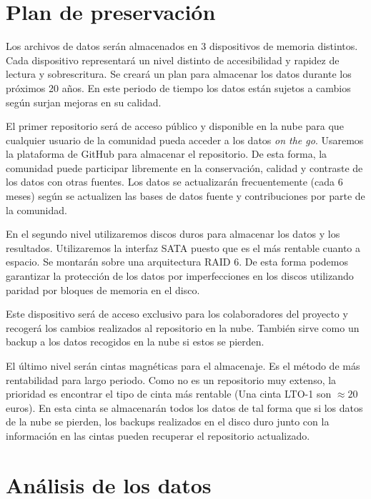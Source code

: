 \documentclass[12pt, spanish]{article}
\begin{document}
\section{Plan de preservación}
Los archivos de datos serán almacenados en 3 dispositivos de memoria distintos. Cada dispositivo representará un nivel distinto de accesibilidad y rapidez de lectura y sobrescritura. Se creará un plan para almacenar los datos durante los próximos 20 años. En este periodo de tiempo los datos están sujetos a cambios según surjan mejoras en su calidad.

El primer repositorio será de acceso público y disponible en la nube para que cualquier usuario de la comunidad pueda acceder a los datos \textit{on the go}. Usaremos la plataforma de GitHub para almacenar el repositorio. De esta forma, la comunidad puede participar libremente en la conservación, calidad y contraste de los datos con otras fuentes. Los datos se actualizarán frecuentemente (cada 6 meses) según se actualizen las bases de datos fuente y contribuciones por parte de la comunidad.

En el segundo nivel utilizaremos discos duros para almacenar los datos y los resultados. Utilizaremos la interfaz SATA puesto que es el más rentable cuanto a espacio. Se montarán sobre una arquitectura RAID 6. De esta forma podemos garantizar la protección de los datos por imperfecciones en los discos utilizando paridad por bloques de memoria en el disco.

Este dispositivo será de acceso exclusivo para los colaboradores del proyecto y recogerá los cambios realizados al repositorio en la nube. También sirve como un backup a los datos recogidos en la nube si estos se pierden.

El último nivel serán cintas magnéticas para el almacenaje. Es el método de más rentabilidad para largo periodo. Como no es un repositorio muy extenso, la prioridad es encontrar el tipo de cinta más rentable (Una cinta LTO-1 son $\approx 20$ euros). En esta cinta se almacenarán todos los datos de tal forma que si los datos de la nube se pierden, los backups realizados en el disco duro junto con la información en las cintas pueden recuperar el repositorio actualizado.



\section{Análisis de los datos}
\end{document}
